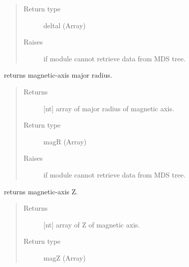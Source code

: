 \documentclass[letterpaper,10pt,english]{sphinxmanual}
\begin{document}
\begin{fulllineitems}
\begin{fulllineitems}
\begin{quote}
\begin{description}
\item[{Return type}] \leavevmode
deltal (Array)

\item[{Raises}] \leavevmode
{} \textendash{} if module cannot retrieve data from MDS tree.

\end{description}\end{quote}

\end{fulllineitems}


\begin{fulllineitems}
\label{\detokenize{eqtools:eqtools.TCVLIUQE.TCVLIUQETree.getMagR}}
returns magnetic-axis major radius.
\begin{quote}\begin{description}
\item[{Returns}] \leavevmode
{[}nt{]} array of major radius of magnetic axis.

\item[{Return type}] \leavevmode
magR (Array)

\item[{Raises}] \leavevmode
{} \textendash{} if module cannot retrieve data from MDS tree.

\end{description}\end{quote}

\end{fulllineitems}


\begin{fulllineitems}
\label{\detokenize{eqtools:eqtools.TCVLIUQE.TCVLIUQETree.getMagZ}}
returns magnetic-axis Z.
\begin{quote}\begin{description}
\item[{Returns}] \leavevmode
{[}nt{]} array of Z of magnetic axis.

\item[{Return type}] \leavevmode
magZ (Array)


\end{description}
\end{quote}
\end{fulllineitems}
\end{fulllineitems}
\end{document}
